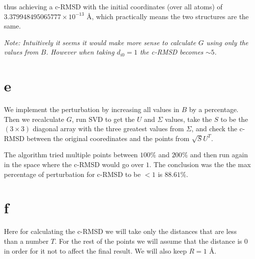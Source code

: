 \documentclass[a4paper,11pt]{article}
\begin{document}
thus achieving a c-RMSD with the initial coordinates (over all atoms) of $3.379948495065777 \times 10^{-13}$ \AA, which practically means the two structures are the same.

\vspace{5mm}

\textit{Note: Intuitively it seems it would make more sense to calculate $G$ using only the values from $B$. However when taking $d_{i0} = 1$ the c-RMSD becomes $\sim 5$.}

\section*{e}

We implement the perturbation by increasing all values in $B$ by a percentage.
Then we recalculate $G$, run SVD to get the $U$ and $\Sigma$ values, take the $S$ to be the $(3 \times 3)$ diagonal array with the three greatest values from $\Sigma$, and check the c-RMSD between the original cooredinates and the points from $\sqrt{S}U^T$.

The algorithm tried multiple points between $100\%$ and $200\%$ and then run again in the space where the c-RMSD would go over $1$. The conclusion was the the max percentage of perturbation for c-RMSD to be $< 1$ is $88.61\%$.

\section*{f}

Here for calculating the c-RMSD we will take only the distances that are less than a number $T$.
For the rest of the points we will assume that the distance is $0$ in order for it not to affect the final result.
We will also keep $R = 1$ \AA.
\end{document}
